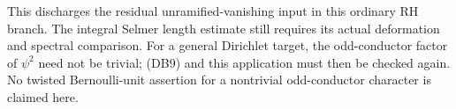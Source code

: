 This discharges the residual unramified-vanishing input in this
ordinary RH branch.  The integral Selmer length estimate still
requires its actual deformation and spectral comparison.
For a general Dirichlet target, the odd-conductor factor of
$\psi^2$ need not be trivial; (DB9) and this application must
then be checked again.  No twisted Bernoulli-unit assertion
for a nontrivial odd-conductor character is claimed here.
